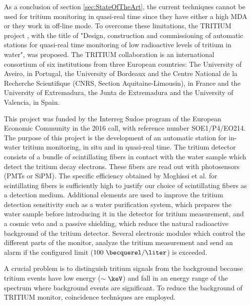As a conclusion of section \ref{sec:StateOfTheArt}, the current techniques cannot be used for tritium monitoring in quasi-real time since they have either a high MDA or they work in off-line mode. To overcome these limitations, the TRITIUM project \cite{TRITIUM}, with the title of "Design, construction and commissioning of automatic stations for quasi-real time monitoring of low radioactive levels of tritium in water", was proposed. The TRITIUM collaboration is an international consortium of six institutions from three European countries: The University of Aveiro, in Portugal, the University of Bordeaux and the Centre National de la Recherche Scientifique (CNRS, Section Aquitaine-Limousin), in France and the University of Extremadura, the Junta de Extremadura and the University of Valencia, in Spain.

This project was funded by the Interreg Sudoe program of the European Economic Community in the 2016 call, with reference number SOE1/P4/EO214. The purpose of this project is the development of an automatic station for in-water tritium monitoring, in situ and in quasi-real time. The tritium detector consists of a bundle of scintillating fibers in contact with the water sample which detect the tritium decay electrons. These fibers are read out with photosensors (PMTs or SiPM). The specific efficiency obtained by Moghissi et al. for scintillating fibers is sufficiently high to justify our choice of scintillating fibers as a detection medium. Additional elements are used to improve the tritium detection sensitivity such as a water purification system, which prepares the water sample before introducing it in the detector for tritium measurement, and a cosmic veto and a passive shielding, which reduce the natural radioactive background of the tritium detector. Several electronic modules which control the different parts of the monitor, analyze the tritium measurement and send an alarm if the configured limit ($100~\becquerel/\liter$) is exceeded.

A crucial problem is to distinguish tritium signals from the background because tritium events have low energy ($\sim\keV$) and fall in an energy range of the spectrum where background events are significant. To reduce the background of TRITIUM monitor, coincidence techniques are employed.


